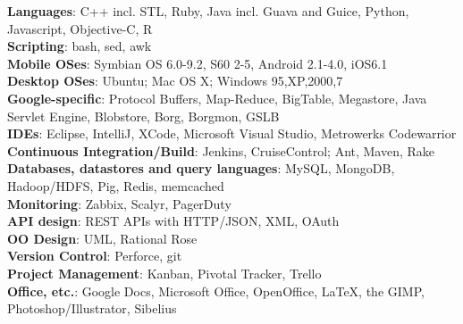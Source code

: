 \documentclass[margin = 0cm,line]{resume}
\begin{document}
\begin{resume}
    \textbf{Languages}: C++ incl. STL, Ruby, Java incl. Guava and Guice, Python, Javascript, Objective-C, R	  \vspace{0.5mm}\\%
    \textbf{Scripting}: bash, sed, awk                                                                         \vspace{0.5mm}\\%
    \textbf{Mobile OSes}: Symbian OS 6.0-9.2, S60 2-5, Android 2.1-4.0, iOS6.1                                 \vspace{0.5mm}\\%
    \textbf{Desktop OSes}: Ubuntu; Mac OS X; Windows 95,XP,2000,7                                              \vspace{0.5mm}\\%
    \textbf{Google-specific}: Protocol Buffers, Map-Reduce, BigTable, Megastore, Java Servlet Engine,
                     Blobstore, Borg, Borgmon, GSLB                                                   \vspace{0.5mm}\\%
    \textbf{IDEs}: Eclipse, IntelliJ, XCode, Microsoft Visual Studio, Metrowerks Codewarrior                   \vspace{0.5mm}\\%
    \textbf{Continuous Integration/Build}: Jenkins, CruiseControl; Ant, Maven, Rake                            \vspace{0.5mm}\\%
    \textbf{Databases, datastores and query languages}: MySQL, MongoDB, Hadoop/HDFS, Pig, Redis, memcached     \vspace{0.5mm}\\%
    \textbf{Monitoring}: Zabbix, Scalyr, PagerDuty                                                             \vspace{0.5mm}\\%
    \textbf{API design}: REST APIs with HTTP/JSON, XML, OAuth                                                  \vspace{0.5mm}\\%
    \textbf{OO Design}: UML, Rational Rose                                                                     \vspace{0.5mm}\\%
    \textbf{Version Control}: Perforce, git                                                                    \vspace{0.5mm}\\%
    \textbf{Project Management}: Kanban, Pivotal Tracker, Trello                                               \vspace{0.5mm}\\%
    \textbf{Office, etc.}: Google Docs, Microsoft Office, OpenOffice, \LaTeX, the GIMP, Photoshop/Illustrator, Sibelius


\end{resume}
\end{document}
